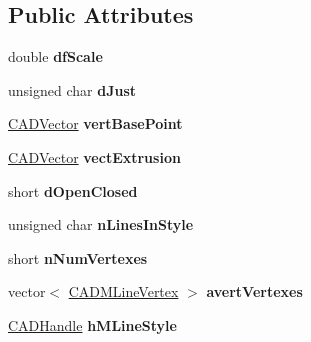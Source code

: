\subsection*{Public Attributes}
\begin{DoxyCompactItemize}
\item 
double {\bfseries df\+Scale}\hypertarget{class_c_a_d_m_line_object_a89af070519c1cd00190ab6d4cb31992f}{}\label{class_c_a_d_m_line_object_a89af070519c1cd00190ab6d4cb31992f}

\item 
unsigned char {\bfseries d\+Just}\hypertarget{class_c_a_d_m_line_object_a836492a72ea38e08ebe334de0fbebe9a}{}\label{class_c_a_d_m_line_object_a836492a72ea38e08ebe334de0fbebe9a}

\item 
\hyperlink{class_c_a_d_vector}{C\+A\+D\+Vector} {\bfseries vert\+Base\+Point}\hypertarget{class_c_a_d_m_line_object_ae25e161b257eb1a57de314377ba247ea}{}\label{class_c_a_d_m_line_object_ae25e161b257eb1a57de314377ba247ea}

\item 
\hyperlink{class_c_a_d_vector}{C\+A\+D\+Vector} {\bfseries vect\+Extrusion}\hypertarget{class_c_a_d_m_line_object_a8add8dd1b87abbc8325d1993640cfffe}{}\label{class_c_a_d_m_line_object_a8add8dd1b87abbc8325d1993640cfffe}

\item 
short {\bfseries d\+Open\+Closed}\hypertarget{class_c_a_d_m_line_object_a190035f9ebc186017d29abcec625b4bc}{}\label{class_c_a_d_m_line_object_a190035f9ebc186017d29abcec625b4bc}

\item 
unsigned char {\bfseries n\+Lines\+In\+Style}\hypertarget{class_c_a_d_m_line_object_a2bc2dc32a7cf14df6861f5488038d2e1}{}\label{class_c_a_d_m_line_object_a2bc2dc32a7cf14df6861f5488038d2e1}

\item 
short {\bfseries n\+Num\+Vertexes}\hypertarget{class_c_a_d_m_line_object_ae8da6b01959d5717122da17bbba3f19b}{}\label{class_c_a_d_m_line_object_ae8da6b01959d5717122da17bbba3f19b}

\item 
vector$<$ \hyperlink{struct__mlinevertex}{C\+A\+D\+M\+Line\+Vertex} $>$ {\bfseries avert\+Vertexes}\hypertarget{class_c_a_d_m_line_object_a1cd3715f0fd989ace24f8b0b1c8c3a33}{}\label{class_c_a_d_m_line_object_a1cd3715f0fd989ace24f8b0b1c8c3a33}

\item 
\hyperlink{class_c_a_d_handle}{C\+A\+D\+Handle} {\bfseries h\+M\+Line\+Style}\hypertarget{class_c_a_d_m_line_object_ad496da713b0f00c25d95c0c547880b18}{}\label{class_c_a_d_m_line_object_ad496da713b0f00c25d95c0c547880b18}

\end{DoxyCompactItemize}

